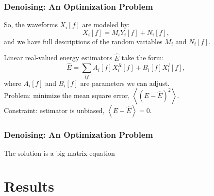 \documentclass{beamer}
\begin{document}
\begin{frame}
\begin{center}
\frametitle{Denoising: An Optimization Problem}
\end{center}
So, the waveforms $X_i[f]$ are modeled by:
\[X_i[f] = M_i Y_i[f] + N_i[f],\]
and we have full descriptions of the random variables $M_i$ and $N_i[f]$.

Linear real-valued energy estimators $\widehat{E}$ take the form:
\[\widehat{E} = \sum_{if} A_i[f] X^R_i[f] + B_i[f] X^I_i[f],\]
where $A_i[f]$ and $B_i[f]$ are parameters we can adjust.\\[0.5\baselineskip]

Problem: minimize the mean square error, $\left<\left(E-\widehat{E}\right)^2\right>$.\\[0.5\baselineskip]
Constraint:  estimator is unbiased, $\left<E-\widehat{E}\right>=0$.
\end{frame}

\begin{frame}
\begin{center}
\frametitle{Denoising: An Optimization Problem}
\end{center}
The solution is a big matrix equation
\end{frame}

\section{Results}
\end{document}
